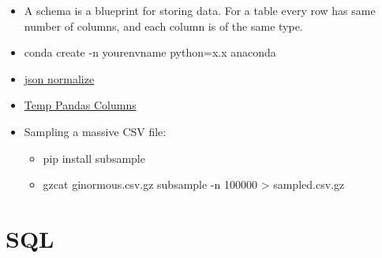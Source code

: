 \documentclass[]{book}
\theoremstyle{definition}
\theoremstyle{definition}
\theoremstyle{definition}
\theoremstyle{remark}
\begin{document}
\begin{itemize}
\item
  A schema is a blueprint for storing data. For a table every row has
  same number of columns, and each column is of the same type.
\item
  conda create -n yourenvname python=x.x anaconda
\item
  \href{http://pandas.pydata.org/pandas-docs/stable/generated/pandas.io.json.json_normalize.html}{json
  normalize}
\item
  \href{https://github.com/jreback/PyDataNYC2015/blob/master/whats-new-in-pandas/v0.16.x.ipynb}{Temp
  Pandas Columns}
\item
  Sampling a massive CSV file:

  \begin{itemize}
  \item
    pip install subsample
  \item
    gzcat ginormous.csv.gz \textbar{} subsample -n 100000 \textgreater{}
    sampled.csv.gz
  \end{itemize}
\end{itemize}

\section{SQL}\label{sql}
\end{document}
